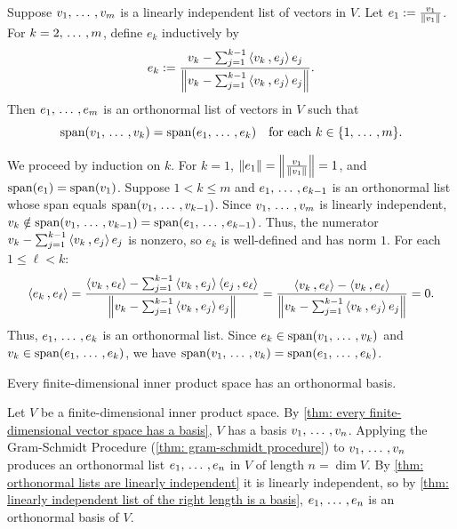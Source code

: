 \begin{thm}
  \label{thm: gram-schmidt procedure}
  Suppose $v_1, {\, \ldots \,\,}, v_m$ is a linearly independent list of vectors in $V$. Let $e_1 := \frac{v_1}{\left \lVert v_1 \right \rVert}$. For $k = 2, {\, \ldots \,\,}, m$, define $e_k$ inductively by
  \begin{equation}
    e_k := \frac{v_k - \sum_{j=1}^{k-1} \ip{v_k}{e_j} e_j}{\norm{v_k - \sum_{j=1}^{k-1} \ip{v_k}{e_j} e_j}}.
  \end{equation}
  Then $e_1, {\, \ldots \,\,}, e_m$ is an orthonormal list of vectors in $V$ such that
  \begin{equation}
    \operatorname{span} (v_1, {\, \ldots \,\,}, v_k) = \operatorname{span} (e_1, {\, \ldots \,\,}, e_k) \quad \text{for each } k \in \{1, {\, \ldots \,\,}, m\}.
  \end{equation}
\end{thm}
\begin{prf}
  We proceed by induction on $k$. For $k=1$, $\left \lVert e_1 \right \rVert = \left \lVert \frac{v_1}{\left \lVert v_1 \right \rVert} \right \rVert = 1$, and $\operatorname{span} (e_1) = \operatorname{span} (v_1)$.
  Suppose $1 < k \leq m$ and $e_1, {\, \ldots \,\,}, e_{k-1}$ is an orthonormal list whose span equals $\operatorname{span} (v_1, {\, \ldots \,\,}, v_{k-1})$.
  Since $v_1, {\, \ldots \,\,}, v_m$ is linearly independent, $v_k \notin \operatorname{span} (v_1, {\, \ldots \,\,}, v_{k-1}) = \operatorname{span} (e_1, {\, \ldots \,\,}, e_{k-1})$.
  Thus, the numerator $v_k - \sum_{j=1}^{k-1} \ip{v_k}{e_j} e_j$ is nonzero, so $e_k$ is well-defined and has norm $1$.
  For each $1 \leq \ell < k$:
  \begin{equation}
    \ip{e_k}{e_\ell} = \frac{\ip{v_k}{e_\ell} - \sum_{j=1}^{k-1} \ip{v_k}{e_j} \ip{e_j}{e_\ell}}{\norm{v_k - \sum_{j=1}^{k-1} \ip{v_k}{e_j} e_j}} = \frac{\ip{v_k}{e_\ell} - \ip{v_k}{e_\ell}}{\norm{v_k - \sum_{j=1}^{k-1} \ip{v_k}{e_j} e_j}} = 0.
  \end{equation}
  Thus, $e_1, {\, \ldots \,\,}, e_k$ is an orthonormal list.
  Since $e_k \in \operatorname{span} (v_1, {\, \ldots \,\,}, v_k)$ and $v_k \in \operatorname{span} (e_1, {\, \ldots \,\,}, e_k)$, we have $\operatorname{span} (v_1, {\, \ldots \,\,}, v_k) = \operatorname{span} (e_1, {\, \ldots \,\,}, e_k)$.
\end{prf}

\begin{thm}
  \label{thm: existence of orthonormal basis}
  Every finite-dimensional inner product space has an orthonormal basis.
\end{thm}
\begin{prf}
  Let $V$ be a finite-dimensional inner product space. By \ref{thm: every finite-dimensional vector space has a basis}, $V$ has a basis $v_1, {\, \ldots \,\,}, v_n$. Applying the Gram-Schmidt Procedure (\ref{thm: gram-schmidt procedure}) to $v_1, {\, \ldots \,\,}, v_n$ produces an orthonormal list $e_1, {\, \ldots \,\,}, e_n$ in $V$ of length $n = \dim V$. By \ref{thm: orthonormal lists are linearly independent} it is linearly independent, so by \ref{thm: linearly independent list of the right length is a basis}, $e_1, {\, \ldots \,\,}, e_n$ is an orthonormal basis of $V$.
\end{prf}

